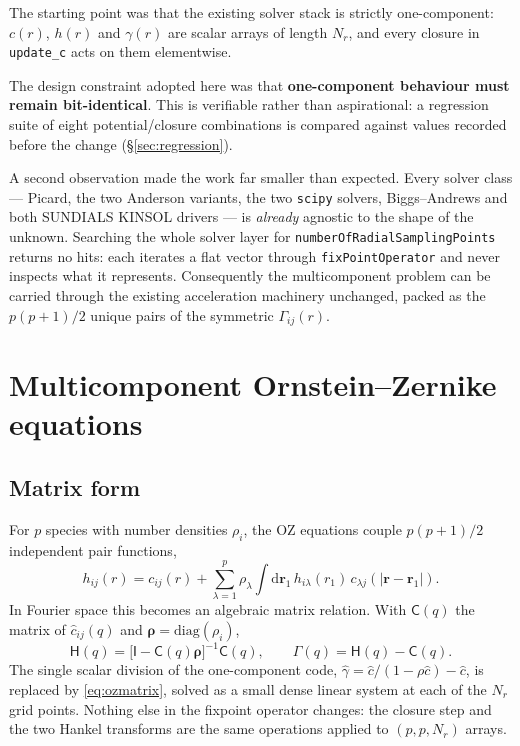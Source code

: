\documentclass[11pt,a4paper]{article}
\newcommand{\code}[1]{\texttt{#1}}
\begin{document}
The starting point was that the existing solver stack is strictly
one-component: $c(r)$, $h(r)$ and $\gamma(r)$ are scalar arrays of length
$N_r$, and every closure in \code{update\_c} acts on them elementwise.

The design constraint adopted here was that \textbf{one-component behaviour
must remain bit-identical}. This is verifiable rather than aspirational: a
regression suite of eight potential/closure combinations is compared against
values recorded before the change (\S\ref{sec:regression}).

A second observation made the work far smaller than expected. Every solver
class --- Picard, the two Anderson variants, the two \code{scipy} solvers,
Biggs--Andrews and both SUNDIALS KINSOL drivers --- is \emph{already}
agnostic to the shape of the unknown. Searching the whole solver layer for
\code{numberOfRadialSamplingPoints} returns no hits: each iterates a flat
vector through \code{fixPointOperator} and never inspects what it represents.
Consequently the multicomponent problem can be carried through the existing
acceleration machinery unchanged, packed as the $p(p+1)/2$ unique pairs of the
symmetric $\Gamma_{ij}(r)$.

\section{Multicomponent Ornstein--Zernike equations}

\subsection{Matrix form}

For $p$ species with number densities $\rho_i$, the OZ equations couple
$p(p+1)/2$ independent pair functions,
\begin{equation}
h_{ij}(r) = c_{ij}(r)
  + \sum_{\lambda=1}^{p}\rho_\lambda \int \mathrm{d}\mathbf{r}_1\,
    h_{i\lambda}(r_1)\,c_{\lambda j}(|\mathbf{r}-\mathbf{r}_1|).
\end{equation}
In Fourier space this becomes an algebraic matrix relation. With
$\mathsf{C}(q)$ the matrix of $\hat c_{ij}(q)$ and
$\boldsymbol{\rho}=\mathrm{diag}(\rho_i)$,
\begin{equation}
\mathsf{H}(q) = \bigl[\mathsf{I}-\mathsf{C}(q)\boldsymbol{\rho}\bigr]^{-1}
                \mathsf{C}(q),
\qquad
\mathsf{\Gamma}(q) = \mathsf{H}(q)-\mathsf{C}(q).
\label{eq:ozmatrix}
\end{equation}
The single scalar division of the one-component code,
$\hat\gamma = \hat c/(1-\rho\hat c) - \hat c$, is replaced by
\eqref{eq:ozmatrix}, solved as a small dense linear system at each of the
$N_r$ grid points. Nothing else in the fixpoint operator changes: the closure
step and the two Hankel transforms are the same operations applied to
$(p,p,N_r)$ arrays.
\end{document}
